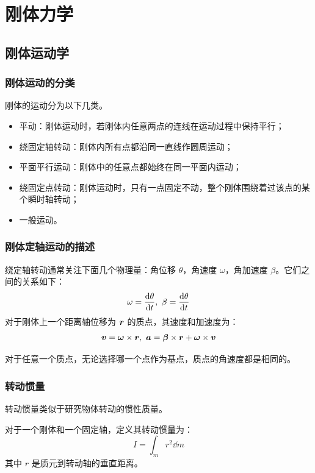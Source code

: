 \section{刚体力学}

\subsection{刚体运动学}

\subsubsection{刚体运动的分类}

刚体的运动分为以下几类。

\begin{itemize}
    \item 平动：刚体运动时，若刚体内任意两点的连线在运动过程中保持平行；
    \item 绕固定轴转动：刚体内所有点都沿同一直线作圆周运动；
    \item 平面平行运动：刚体中的任意点都始终在同一平面内运动；
    \item 绕固定点转动：刚体运动时，只有一点固定不动，整个刚体围绕着过该点的某个瞬时轴转动；
    \item 一般运动。
\end{itemize}

\subsubsection{刚体定轴运动的描述}

绕定轴转动通常关注下面几个物理量：角位移 $\theta$，角速度 $\omega$，角加速度 $\beta$。它们之间的关系如下：
$$
\omega = \dv{\theta}{t},\ \beta = \dv{\theta}{t}
$$
对于刚体上一个距离轴位移为 $\boldsymbol{r}$ 的质点，其速度和加速度为：
$$
\vect{v} = \vect{\omega} \times \vect{r},\ \vect{a} = \vect{\beta} \times \vect{r} + \vect{\omega} \times \vect{v}
$$

对于任意一个质点，无论选择哪一个点作为基点，质点的角速度都是相同的。

\subsubsection{转动惯量}

转动惯量类似于研究物体转动的惯性质量。

\begin{definition}[转动惯量]
    对于一个刚体和一个固定轴，定义其转动惯量为：
    $$
    I = \int_m r^2 \dd{m}
    $$
    其中 $r$ 是质元到转动轴的垂直距离。
\end{definition}


